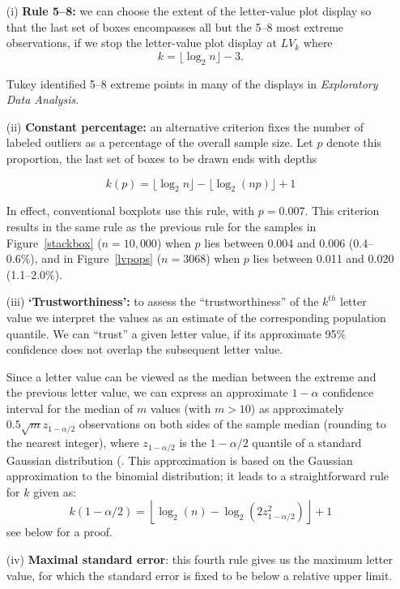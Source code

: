 \documentclass[12pt,oneside]{article}
\begin{document}
\begin{enumerate}
\item[(i)]{\bf Rule 5--8:}
we can choose the extent of the letter-value plot display so that the last set of boxes encompasses all but the 5--8 most extreme observations, if we stop the letter-value plot display at $LV_k$ where 
%
\begin{equation}
k = \lfloor \log_2 n \rfloor - 3.
\end{equation}
%

\noindent Tukey identified 5--8 extreme points  in many of the displays in \textit{Exploratory Data Analysis}.

\item[(ii)]{\bf Constant percentage:}
an alternative criterion fixes the number of labeled outliers as a percentage of the overall sample size.
 Let $p$ denote this proportion, the last set of boxes to be drawn ends with depths

\begin{equation}
k(p) = \lfloor \log_2 n \rfloor - \lfloor \log_2 (np) \rfloor + 1
\end{equation}

\noindent In effect, conventional boxplots use this rule, with $p = 0.007$. This criterion results in the same rule as the previous rule for the samples in Figure~\ref{stackbox} ($n = 10,000$) when $p$ lies between 0.004 and 0.006 (0.4--0.6\%), and in Figure~\ref{lvpops} ($n = 3068$) when $p$ lies between 0.011 and 0.020 (1.1--2.0\%).

\item[(iii)] {\bf  `Trustworthiness':}
to assess the ``trustworthiness'' of the $k^{th}$ letter value we interpret the values as an estimate of the corresponding population quantile. We can ``trust''  a given letter value, if  its approximate 95\% confidence does not overlap the subsequent letter value.

Since a letter value can be viewed as the median between the extreme and the previous letter value, we can express an approximate $1-\alpha$ confidence interval for the median of $m$ values (with $m > 10$) as approximately $0.5 \sqrt{m} z_{1-\alpha/2}$ observations on both sides of the sample median (rounding to the nearest integer), where $z_{1-\alpha/2}$ is the ${1-\alpha/2}$ quantile of a standard Gaussian distribution (\citet[161]{ha.order}. This approximation is based on the Gaussian approximation to the binomial distribution; it leads to a straightforward rule for $k$ given as:
\begin{equation}
k(1-\alpha/2) =  \left \lfloor \log_2 (n) - \log_2 
   \left(2  z_{1-\alpha/2}^2 \right) \right \rfloor + 1
\end{equation}
see below for a proof.
\item[(iv)]{\bf Maximal standard error}:
this fourth rule gives us the maximum letter value, for which the standard error is fixed to be below a relative upper limit. 


\end{enumerate}
\end{document}
